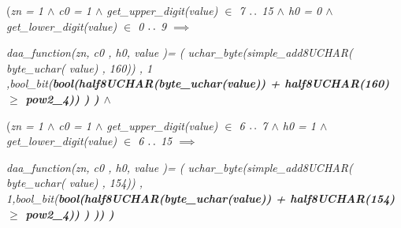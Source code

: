 \documentclass[11pt]{article}
\begin{document}
\begin{sloppypar}
\hspace*{0.60in}\rm (\hspace*{0.10in}\it zn \rm = \rm 1  $\land$  \it c0 \rm = \rm 1  $\land$  \it get\_upper\_digit\rm (\it value\rm )  $\in$  \rm 7 $\mathbin{\ldotp\ldotp}$ \rm 1\rm 5  $\land$  \it h0 \rm = \rm 0  $\land$  \it get\_lower\_digit\rm (\it value\rm )  $\in$  \rm 0 $\mathbin{\ldotp\ldotp}$ \rm 9  $\implies$ 

\hspace*{0.80in}\it daa\_function\rm (\it zn\rm , \it c0 \rm , \it h0\hspace*{0.10in}\rm , \it value \rm )\rm = \rm ( \it uchar\_byte\rm (\it simple\_add8UCHAR\rm ( \it byte\_uchar\rm ( \it value\rm ) \rm , \rm 1\rm 6\rm 0\rm )\rm ) \rm , \rm 1 \rm ,\hspace*{0.10in}\it bool\_bit\rm (\bf bool\rm (\hspace*{0.15in}\it half8UCHAR\rm (\it byte\_uchar\rm (\it value\rm )\rm ) \rm + \it half8UCHAR\rm (\rm 1\rm 6\rm 0\rm )  $\geq$  \it pow2\_4\rm )\rm ) \rm ) \rm ) $\land$ 

\hspace*{0.60in}\rm (\hspace*{0.10in}\it zn \rm = \rm 1  $\land$  \it c0 \rm = \rm 1  $\land$  \it get\_upper\_digit\rm (\it value\rm )  $\in$  \rm 6 $\mathbin{\ldotp\ldotp}$ \rm 7  $\land$  \it h0 \rm = \rm 1  $\land$  \it get\_lower\_digit\rm (\it value\rm )  $\in$  \rm 6 $\mathbin{\ldotp\ldotp}$ \rm 1\rm 5  $\implies$ 

\hspace*{0.80in}\it daa\_function\rm (\it zn\rm , \it c0 \rm , \it h0\hspace*{0.10in}\rm , \it value \rm )\rm = \rm ( \it uchar\_byte\rm (\it simple\_add8UCHAR\rm ( \it byte\_uchar\rm ( \it value\rm ) \rm , \rm 1\rm 5\rm 4\rm )\rm ) \rm , \rm 1\rm ,\hspace*{0.10in}\it bool\_bit\rm (\bf bool\rm (\hspace*{0.10in}\it half8UCHAR\rm (\it byte\_uchar\rm (\it value\rm )\rm ) \rm + \it half8UCHAR\rm (\rm 1\rm 5\rm 4\rm )  $\geq$  \it pow2\_4\rm )\rm ) \rm ) \rm )\hspace*{0.10in}\rm ) \rm ) 

\hspace*{0.20in}

\hspace*{0.20in}

\hspace*{0.20in}

\hspace*{0.20in}


\end{sloppypar}
\end{document}

